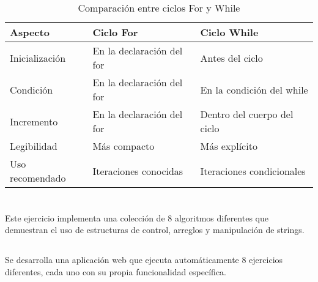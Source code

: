 \documentclass[10pt,a4paper]{article}
\begin{document}
\subsection{\color{colorESCOM}{Comparación For vs While}}
\begin{table}[H]
	\centering
	\begin{tabular}{|p{3cm}|p{5cm}|p{5cm}|}
		\hline
		\textbf{Aspecto} & \textbf{Ciclo For} & \textbf{Ciclo While} \\ \hline
		Inicialización & En la declaración del for & Antes del ciclo \\ \hline
		Condición & En la declaración del for & En la condición del while \\ \hline
		Incremento & En la declaración del for & Dentro del cuerpo del ciclo \\ \hline
		Legibilidad & Más compacto & Más explícito \\ \hline
		Uso recomendado & Iteraciones conocidas & Iteraciones condicionales \\ \hline
	\end{tabular}
	\caption{Comparación entre ciclos For y While}
	\label{tab:for_vs_while}
\end{table}

\pagebreak

\section{\color{colorIPN}{Ejercicio 61: Práctica Completa}}
Este ejercicio implementa una colección de 8 algoritmos diferentes que demuestran el uso de estructuras de control, arreglos y manipulación de strings.

\subsection{\color{colorESCOM}{Descripción del Problema}}
Se desarrolla una aplicación web que ejecuta automáticamente 8 ejercicios diferentes, cada uno con su propia funcionalidad específica.
\end{document}
